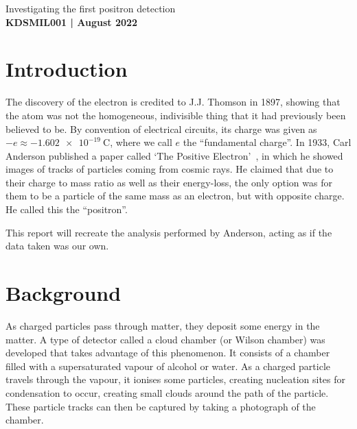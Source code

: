 \documentclass[11pt]{article}
\numberwithin{equation}{section}
\numberwithin{figure}{section}
\numberwithin{table}{section}
\begin{document}
\begin{center}
    {\huge Investigating the first positron detection}\\
    \vspace{0.2in}
    \textbf{KDSMIL001 | August 2022}
    
    \begin{abstract}
        The first image of a positron track in a cloud chamber is analysed in a similar way to the original paper. The momentum of the particle in two regions, as well as mass stopping power for the particle, is found using a graphical method. 
    \end{abstract}
\end{center}

\section{Introduction}\label{sec:Introduction}
The discovery of the electron is credited to J.J. Thomson in 1897, showing that the atom was not the homogeneous, indivisible thing that it had previously been believed to be. By convention of electrical circuits, its charge was given as $-e\approx-\SI{1.602e-19}{\coulomb}$, where we call $e$ the ``fundamental charge''. In 1933, Carl Anderson published a paper called `The Positive Electron'~\cite{Pos_Electron}, in which he showed images of tracks of particles coming from cosmic rays. He claimed that due to their charge to mass ratio as well as their energy-loss, the only option was for them to be a particle of the same mass as an electron, but with opposite charge. He called this the ``positron''. 

This report will recreate the analysis performed by Anderson, acting as if the data taken was our own.

\section{Background}\label{sec:Background}
As charged particles pass through matter, they deposit some energy in the matter. A type of detector called a cloud chamber (or Wilson chamber) was developed that takes advantage of this phenomenon. It consists of a chamber filled with a supersaturated vapour of alcohol or water. As a charged particle travels through the vapour, it ionises some particles, creating nucleation sites for condensation to occur, creating small clouds around the path of the particle. These particle tracks can then be captured by taking a photograph of the chamber.
\end{document}
